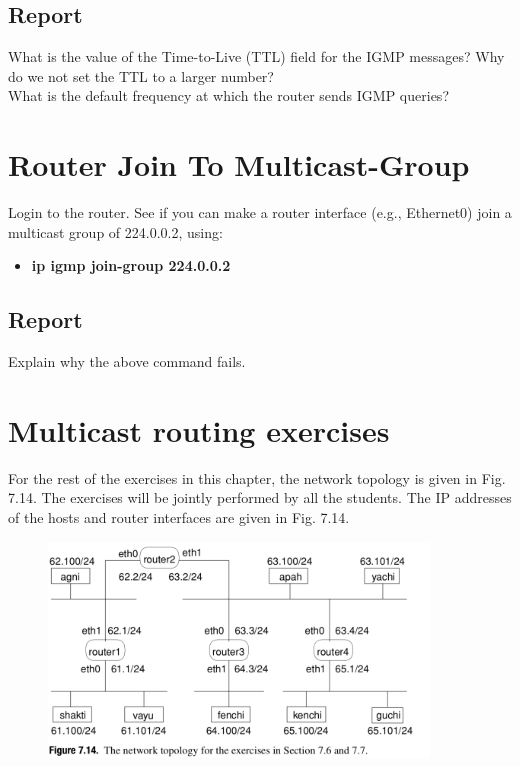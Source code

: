 \documentclass{../UTNetLab}
\begin{document}
    \subsection*{Report}
    What is the value of the Time-to-Live (TTL) field for the IGMP messages?
    Why do we not set the TTL to a larger number? \\
    What is the default frequency at which the router sends IGMP queries?

\section{Router Join To Multicast-Group}
    Login to the router.
    See if you can make a router interface (e.g., Ethernet0) join a multicast group of 224.0.0.2, using:
    \begin{itemize}
        \item [] \textbf{ip igmp join-group 224.0.0.2}
    \end{itemize}
    \subsection*{Report}
    Explain why the above command fails.

\section*{Multicast routing exercises}
    For the rest of the exercises in this chapter, the network topology is given in Fig. 7.14. The exercises will be jointly performed by all the students. The IP addresses of the hosts and router interfaces are given in Fig. 7.14.
    \begin{figure}[H]
        \centering
        \includegraphics[width=0.9\textwidth]{img/figure7-14.png}
        \label{fig:7.14}
    \end{figure}
\end{document}
